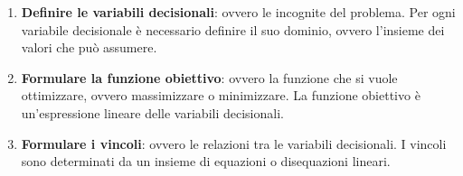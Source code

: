 \documentclass[12pt]{article}
\begin{document}
\begin{enumerate}
	\item \textbf{Definire le variabili decisionali}: ovvero le incognite del
	      problema. Per ogni variabile decisionale è necessario definire il suo
	      dominio, ovvero l'insieme dei valori che può assumere.

	\item \textbf{Formulare la funzione obiettivo}: ovvero la funzione che si
	      vuole ottimizzare, ovvero massimizzare o minimizzare. La funzione
	      obiettivo è un'espressione lineare delle variabili decisionali.

	\item \textbf{Formulare i vincoli}: ovvero le relazioni tra le variabili
	      decisionali. I vincoli sono determinati da un insieme di equazioni o
	      disequazioni lineari.
\end{enumerate}
\end{document}
